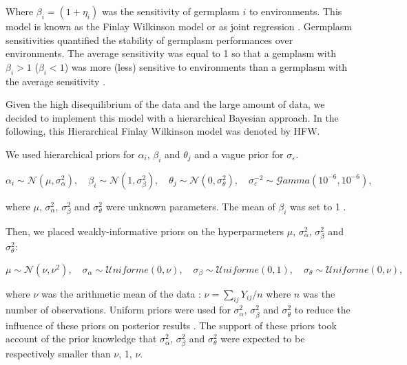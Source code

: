\documentclass{book}\usepackage[]{graphicx}\usepackage[]{color}
\begin{document}
Where $\beta_{i} = (1 + \eta_{i})$ was the sensitivity of germplasm $i$ to environments.
This model is known as the Finlay Wilkinson model or as joint regression \citep{finlay_analysis_1963}.
Germplasm sensitivities quantified the stability of germplasm performances over environments.
The average sensitivity was equal to 1 so that a gemplasm with $\beta_{i} > 1$ ($\beta_{i} < 1$) was more (less) sensitive to environments than a germplasm with the average sensitivity \citep{nabugoomu_analysis_1999}.

Given the high disequilibrium of the data and the large amount of data, we decided to implement this model with a hierarchical Bayesian approach.
In the following, this Hierarchical Finlay Wilkinson model was denoted by HFW.

We used hierarchical priors for $\alpha_i$, $\beta_i$ and $\theta_j$ and a vague prior for $\sigma_{\varepsilon}$.

\begin{displaymath}
\alpha_{i} \sim \mathcal{N} (\mu,\sigma^2_{\alpha}), \quad 
\beta_{i} \sim \mathcal{N} (1,\sigma^2_{\beta}), \quad 
\theta_{j} \sim \mathcal{N} (0,\sigma^2_{\theta}), \quad 
\sigma^{-2}_{\varepsilon} \sim \mathcal{G}amma (10^{-6},10^{-6}),
\end{displaymath}

where $\mu$, $\sigma^2_{\alpha}$, $\sigma^2_{\beta}$ and $\sigma^2_{\theta}$ were unknown parameters.
The mean of $\beta_i$ was set to 1 \citep{nabugoomu_analysis_1999}.


Then, we placed weakly-informative priors on the hyperparmeters  $\mu$, $\sigma^2_{\alpha}$, $\sigma^2_{\beta}$ and $\sigma^2_{\theta}$:

\begin{displaymath}
\mu \sim \mathcal{N} (\nu,\nu^2), \quad 
\sigma_{\alpha} \sim \mathcal{U}niforme (0,\nu), \quad 
\sigma_{\beta} \sim \mathcal{U}niforme (0,1), \quad 
\sigma_{\theta} \sim \mathcal{U}niforme (0,\nu),
\end{displaymath}

where $\nu$ was the arithmetic mean of the data : $\nu = \sum_{ij} {Y_{ij}/n}$ where $n$ was the number of observations.
Uniform priors were used for $\sigma^2_{\alpha}$, $\sigma^2_{\beta}$ and $\sigma^2_{\theta}$ to reduce the influence of these priors on posterior results \citep{gelman__2006}.
The support of these priors took account of the prior knowledge that $\sigma^2_{\alpha}$, $\sigma^2_{\beta}$ and $\sigma^2_{\theta}$ were expected to be respectively smaller than $\nu$, 1, $\nu$. \\
\end{document}
